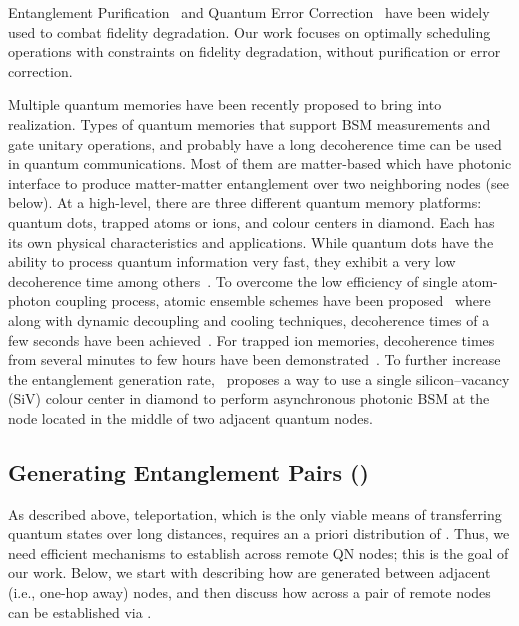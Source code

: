 Entanglement Purification~\cite[e.g.]{BreigelEtAl1998} and Quantum Error 
Correction~\cite[e.g.]{QEC} have been widely used to combat fidelity 
degradation.  
Our work focuses on optimally scheduling \es operations with constraints
on fidelity degradation, without purification or error correction.

Multiple quantum memories have been recently proposed to 
bring  into realization. 
Types of quantum memories that support BSM measurements and gate unitary operations, and probably have a long decoherence time can be used in quantum communications.
Most of them are matter-based 
which have photonic interface to produce matter-matter entanglement 
over two neighboring nodes (see below).
At a high-level, there are three different quantum memory platforms: quantum dots, trapped atoms or ions, and colour centers in diamond. 
Each has its own physical characteristics and applications. 
While quantum dots have the ability to process quantum information very fast, 
they exhibit a very low decoherence time among 
others~\cite{press2010ultrafast, wang2019towards}. 
To overcome the low efficiency of single atom-photon coupling process, 
atomic ensemble schemes have been proposed~\cite{dlcz} where along with dynamic decoupling and cooling techniques, decoherence times of a few seconds have been achieved~\cite{sagi10, vetsch10, deutsch10}.
For trapped ion memories, decoherence times from several minutes to few hours have been demonstrated~\cite{ionqmemory05, ionqmemory21}.
To further 
increase the entanglement generation rate,~\cite{bhaskar2020experimental} proposes a way to use a single silicon–vacancy (SiV) 
colour center in diamond to perform asynchronous photonic BSM at 
the node located in the middle of two adjacent quantum nodes.

\subsection{Generating Entanglement Pairs (\epss)}
\label{sec:swapping_eps}

As described above, teleportation, which is the only viable means of transferring quantum states over long distances, requires an a priori distribution of \epss. 
Thus,   we need efficient mechanisms to  establish \epss across remote QN nodes; 
this is the goal of our 
work.
Below, we start with describing how \epss are generated between adjacent
(i.e., one-hop away) nodes, and 
then discuss how \epss across a pair of remote nodes can be established 
via \ess. 


